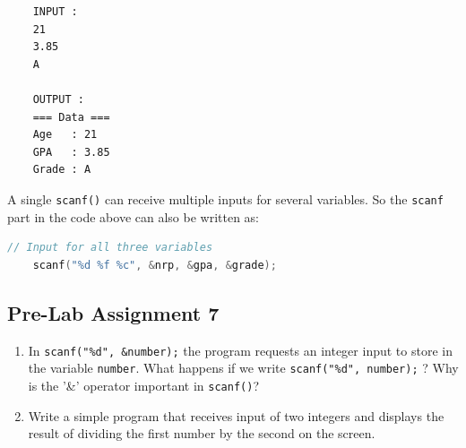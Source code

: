 \begin{verbatim}
    INPUT :
    21
    3.85
    A

    OUTPUT :
    === Data ===
    Age   : 21
    GPA   : 3.85
    Grade : A
\end{verbatim}

A single \verb|scanf()| can receive multiple inputs for several variables.  
So the \verb|scanf| part in the code above can also be written as:

\begin{lstlisting}[language=c]
    // Input for all three variables
    scanf("%d %f %c", &nrp, &gpa, &grade);
\end{lstlisting}

\subsection*{Pre-Lab Assignment 7}
\begin{enumerate}
    \item In \verb|scanf("%d", &number);| the program requests an integer input to store in the variable \verb|number|.  
    What happens if we write \verb|scanf("%d", number);| ? Why is the '\&' operator important in \verb|scanf()|?

    \item Write a simple program that receives input of two integers and displays the result of dividing the first number by the second on the screen.
\end{enumerate}
